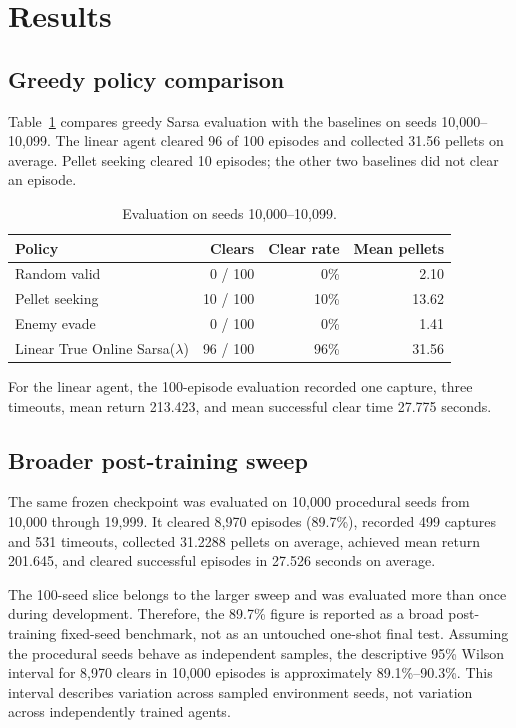 \documentclass[11pt]{article}
\begin{document}
\section{Results}

\subsection{Greedy policy comparison}

Table~\ref{tab:baseline-results} compares greedy Sarsa evaluation with the
baselines on seeds 10,000--10,099. The linear agent cleared 96 of 100 episodes
and collected 31.56 pellets on average. Pellet seeking cleared 10 episodes;
the other two baselines did not clear an episode.

\begin{table}[ht]
\centering
\caption{Evaluation on seeds 10,000--10,099.}
\label{tab:baseline-results}
\begin{tabular}{lrrr}
\toprule
Policy & Clears & Clear rate & Mean pellets \\
\midrule
Random valid & 0 / 100 & 0\% & 2.10 \\
Pellet seeking & 10 / 100 & 10\% & 13.62 \\
Enemy evade & 0 / 100 & 0\% & 1.41 \\
Linear True Online Sarsa($\lambda$) & 96 / 100 & 96\% & 31.56 \\
\bottomrule
\end{tabular}
\end{table}

For the linear agent, the 100-episode evaluation recorded one capture, three
timeouts, mean return 213.423, and mean successful clear time 27.775 seconds.

\subsection{Broader post-training sweep}

The same frozen checkpoint was evaluated on 10,000 procedural seeds from
10,000 through 19,999. It cleared 8,970 episodes (89.7\%), recorded 499
captures and 531 timeouts, collected 31.2288 pellets on average, achieved mean
return 201.645, and cleared successful episodes in 27.526 seconds on average.

The 100-seed slice belongs to the larger sweep and was evaluated more than
once during development. Therefore, the 89.7\% figure is reported as a broad
post-training fixed-seed benchmark, not as an untouched one-shot final test.
Assuming the procedural seeds behave as independent samples, the descriptive
95\% Wilson interval for 8,970 clears in 10,000 episodes is approximately
89.1\%--90.3\%. This interval describes variation across sampled environment
seeds, not variation across independently trained agents.
\end{document}
